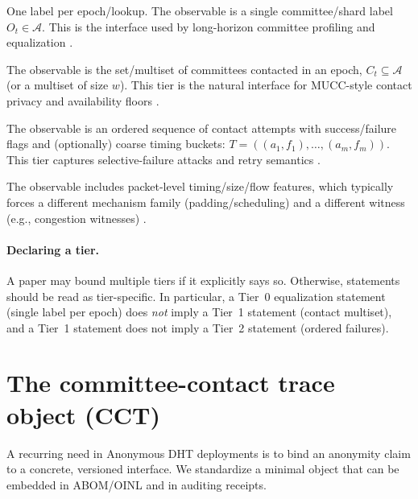 \documentclass[11pt]{article}
\begin{document}
\begin{description}[leftmargin=*]
\item[Tier 0: destination label.] One label per epoch/lookup.
The observable is a single committee/shard label $O_t\in\mathcal{A}$.
This is the interface used by long-horizon committee profiling and equalization \cite{series:profiling}.

\item[Tier 1: contact set or multiset.] The observable is the set/multiset of committees contacted in an epoch,
$C_t\subseteq \mathcal{A}$ (or a multiset of size $w$).
This tier is the natural interface for MUCC-style contact privacy and availability floors \cite{series:state2}.

\item[Tier 2: ordered trace with failures.] The observable is an ordered sequence of contact attempts with success/failure flags and (optionally) coarse timing buckets:
$T = ((a_1,f_1),\ldots,(a_m,f_m))$.
This tier captures selective-failure attacks and retry semantics \cite{WangMittalBorisovCCS2010}.

\item[Tier 3: packet/flow metadata.] The observable includes packet-level timing/size/flow features, which typically forces a different mechanism family (padding/scheduling) and a different witness (e.g., congestion witnesses) \cite{series:schedcompiler,series:congeq}.
\end{description}

\paragraph{Declaring a tier.}
A paper may bound multiple tiers if it explicitly says so.
Otherwise, statements should be read as tier-specific.
In particular, a Tier~0 equalization statement (single label per epoch) does \emph{not} imply a Tier~1 statement (contact multiset), and a Tier~1 statement does not imply a Tier~2 statement (ordered failures).

\section{The committee-contact trace object (CCT)}\label{sec:cct}
A recurring need in Anonymous DHT deployments is to bind an anonymity claim to a concrete, versioned interface.
We standardize a minimal object that can be embedded in ABOM/OINL and in auditing receipts.
\end{document}

